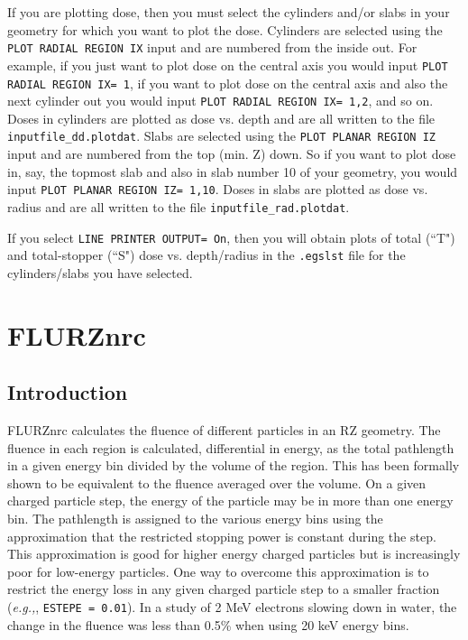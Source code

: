 \documentclass[12pt,twoside]{article}  %
\begin{document}
If you are plotting dose, then you must select the cylinders and/or slabs
in your geometry for which you want to plot the dose.  Cylinders are selected 
using the {\tt PLOT RADIAL REGION IX} input and are numbered from
the inside out.  For example, if you just want to plot dose on the
central axis you would input {\tt PLOT RADIAL REGION IX= 1}, if you want
to plot dose on the central axis and also the next cylinder out you would
input {\tt PLOT RADIAL REGION IX= 1,2}, and so on.  Doses in cylinders are 
plotted as dose vs. depth and are all written to the file
{\tt inputfile\_dd.plotdat}.   Slabs are selected using the
{\tt PLOT PLANAR REGION IZ} input and are numbered from the top (min. Z)
down.  So if you want to plot dose in, say, the topmost slab and also in
slab number 10 of your geometry, you would input
{\tt PLOT PLANAR REGION IZ= 1,10}.  Doses in slabs are plotted as dose vs. radius and are all written to the file {\tt inputfile\_rad.plotdat}.

If you select {\tt LINE PRINTER OUTPUT= On}, then you will obtain plots
of total (``T") and total-stopper (``S") dose vs. depth/radius in the
{\tt .egslst} file
for the cylinders/slabs you have selected.

\section{FLURZnrc}
\renewcommand{\leftmark}{{FLURZnrc}}

\subsection{Introduction}

FLURZnrc calculates the fluence of different particles in an RZ geometry.
The fluence in each region is calculated, differential in energy, as the total pathlength
in a given energy bin divided by the volume of the region. This has been
formally shown to be equivalent to the fluence averaged over the
volume\cite{Ch78,Ch79}.
On a given charged particle step, the energy of the particle may be in more
than one energy bin. The pathlength is assigned to the various energy bins
using the approximation that the restricted stopping power is constant
during the step. This approximation is good for higher energy charged
particles but is increasingly poor for low-energy particles. One way to
overcome this approximation is to restrict the energy loss in any given
charged particle step to a smaller fraction ({\em e.g.,}, {\tt ESTEPE = 0.01}). In a study of 2 MeV electrons slowing down in water, the change in the
fluence was less than 0.5\% when using 20 keV energy bins.
\end{document}
